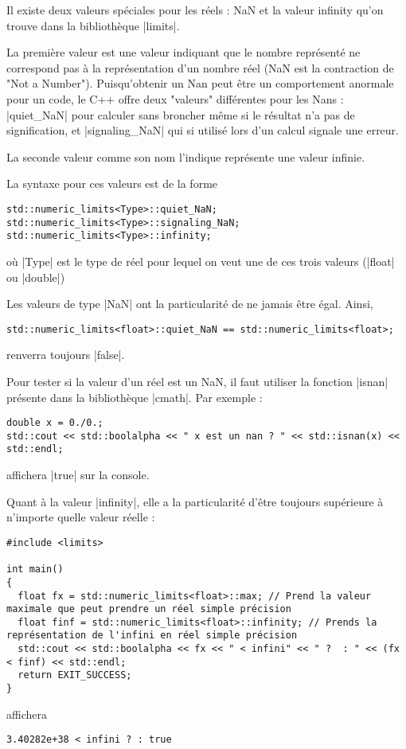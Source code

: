 Il existe deux valeurs spéciales pour les réels : NaN et la valeur infinity qu'on trouve dans la bibliothèque |limits|.

La première valeur est une valeur indiquant que le nombre représenté ne correspond pas à la représentation d'un nombre réel (NaN est la contraction de "Not a Number"). Puisqu'obtenir un Nan peut être un comportement anormale pour un code, le C++ offre deux "valeurs" différentes pour les Nans : |quiet_NaN| pour calculer sans broncher même si le résultat n'a pas de signification, et |signaling_NaN| qui si utilisé lors d'un calcul signale une erreur.

La seconde valeur comme son nom l'indique représente une valeur infinie. 

La syntaxe pour ces valeurs est de la forme
\begin{lstlisting}
std::numeric_limits<Type>::quiet_NaN;
std::numeric_limits<Type>::signaling_NaN;
std::numeric_limits<Type>::infinity;
\end{lstlisting}
où |Type| est le type de réel pour lequel on veut une de ces trois valeurs (|float| ou |double|)

Les valeurs de type |NaN| ont la particularité de ne jamais être égal. Ainsi,
\begin{lstlisting}
std::numeric_limits<float>::quiet_NaN == std::numeric_limits<float>;
\end{lstlisting}
renverra toujours |false|.

Pour tester si la valeur d'un réel est un NaN, il faut utiliser la fonction |isnan| présente dans la bibliothèque |cmath|.
Par exemple :
\begin{lstlisting}
double x = 0./0.; 
std::cout << std::boolalpha << " x est un nan ? " << std::isnan(x) << std::endl;
\end{lstlisting}
affichera |true| sur la console.

Quant à la valeur |infinity|, elle a la particularité d'être toujours supérieure à n'importe quelle valeur réelle :
\begin{lstlisting}
#include <limits>

int main()
{
  float fx = std::numeric_limits<float>::max; // Prend la valeur maximale que peut prendre un réel simple précision
  float finf = std::numeric_limits<float>::infinity; // Prends la représentation de l'infini en réel simple précision
  std::cout << std::boolalpha << fx << " < infini" << " ?  : " << (fx < finf) << std::endl;
  return EXIT_SUCCESS;
}
\end{lstlisting}
affichera
\begin{verbatim}
3.40282e+38 < infini ? : true
\end{verbatim}


